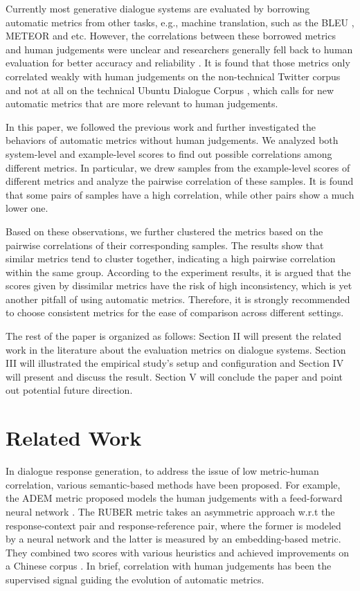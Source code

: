 \documentclass[conference]{IEEEtran}
\begin{document}
Currently most generative dialogue systems are evaluated by borrowing automatic metrics from other tasks, e.g., machine translation, such as the BLEU \cite{BLEU}, METEOR \cite{METEOR} and etc. However, the correlations between these borrowed metrics and human judgements were unclear and researchers generally fell back to human evaluation for better accuracy and reliability \cite{VHRED,Shang}. It is found that those metrics only correlated weakly with human judgements on the non-technical Twitter corpus and not at all on the technical Ubuntu Dialogue Corpus \cite{HowNot}, which calls for new automatic metrics that are more relevant to human judgements.

In this paper, we followed the previous work and further investigated the behaviors of automatic metrics without human judgements. We analyzed both system-level and example-level scores to find out possible correlations among different metrics. In particular, we drew samples from the example-level scores of different metrics and analyze the pairwise correlation of these samples. It is found that some pairs of samples have a high correlation, while other pairs show a much lower one.

Based on these observations, we further clustered the metrics based on the pairwise correlations of their corresponding samples. The results show that similar metrics tend to cluster together, indicating a high pairwise correlation within the same group. According to the experiment results, it is argued that the scores given by dissimilar metrics have the risk of high inconsistency, which is yet another pitfall of using automatic metrics. Therefore, it is strongly recommended to choose consistent metrics for the ease of comparison across different settings.

The rest of the paper is organized as follows: Section II will present the related work in the literature about the evaluation metrics on dialogue systems. Section III will illustrated the empirical study's setup and configuration and Section IV will present and discuss the result. Section V will conclude the paper and point out potential future direction.

\section{Related Work}
In dialogue response generation, to address the issue of low metric-human correlation, various semantic-based methods have been proposed. For example, the ADEM metric proposed models the human judgements with a feed-forward neural network \cite{ADEM}. The RUBER metric takes an asymmetric approach w.r.t the response-context pair and response-reference pair, where the former is modeled by a neural network and the latter is measured by an embedding-based metric. They combined two scores with various heuristics and achieved improvements on a Chinese corpus \cite{RUBER}. In brief, correlation with human judgements has been the supervised signal guiding the evolution of automatic metrics.
\end{document}
